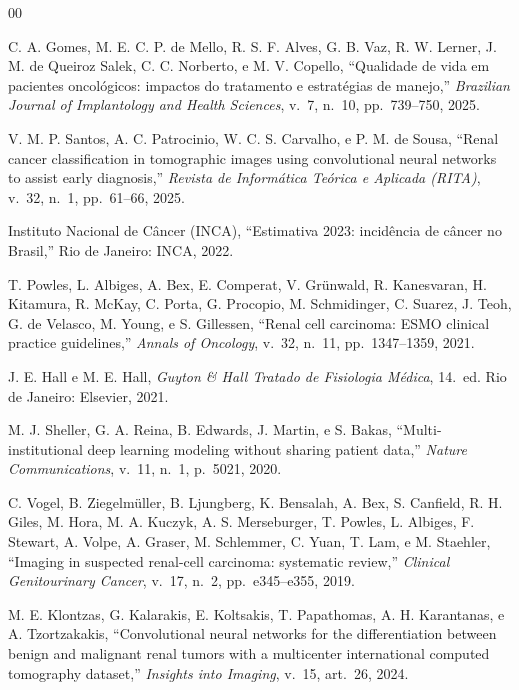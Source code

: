 \documentclass[conference]{IEEEtran}
\begin{document}
\begin{thebibliography}{00}

C. A. Gomes, M. E. C. P. de Mello, R. S. F. Alves, G. B. Vaz,
R. W. Lerner, J. M. de Queiroz Salek, C. C. Norberto, e M. V. Copello,
``Qualidade de vida em pacientes oncológicos: impactos
do tratamento e estratégias de manejo,''
\textit{Brazilian Journal of Implantology and Health Sciences},
v.~7, n.~10, pp.~739--750, 2025.

V. M. P. Santos, A. C. Patrocinio, W. C. S. Carvalho, e P. M. de Sousa,
``Renal cancer classification in tomographic images using convolutional
neural networks to assist early diagnosis,''
\textit{Revista de Informática Teórica e Aplicada (RITA)},
v.~32, n.~1, pp.~61--66, 2025.

Instituto Nacional de Câncer (INCA),
``Estimativa 2023: incidência de câncer no Brasil,''
Rio de Janeiro: INCA, 2022.

T. Powles, L. Albiges, A. Bex, E. Comperat, V. Grünwald, R. Kanesvaran,
H. Kitamura, R. McKay, C. Porta, G. Procopio, M. Schmidinger, C. Suarez,
J. Teoh, G. de Velasco, M. Young, e S. Gillessen,
``Renal cell carcinoma: ESMO clinical practice guidelines,''
\textit{Annals of Oncology}, v.~32, n.~11, pp.~1347--1359, 2021.

J. E. Hall e M. E. Hall,
\textit{Guyton \& Hall Tratado de Fisiologia Médica}, 14.~ed.
Rio de Janeiro: Elsevier, 2021.

M. J. Sheller, G. A. Reina, B. Edwards, J. Martin, e S. Bakas,
``Multi-institutional deep learning modeling without sharing patient data,''
\textit{Nature Communications}, v.~11, n.~1, p.~5021, 2020.

C. Vogel, B. Ziegelmüller, B. Ljungberg, K. Bensalah, A. Bex, S. Canfield,
R. H. Giles, M. Hora, M. A. Kuczyk, A. S. Merseburger, T. Powles, L. Albiges,
F. Stewart, A. Volpe, A. Graser, M. Schlemmer, C. Yuan, T. Lam, e M. Staehler,
``Imaging in suspected renal-cell carcinoma: systematic review,''
\textit{Clinical Genitourinary Cancer}, v.~17, n.~2, pp.~e345--e355, 2019.

M. E. Klontzas, G. Kalarakis, E. Koltsakis, T. Papathomas, A. H. Karantanas,
e A. Tzortzakakis,
``Convolutional neural networks for the differentiation between benign and
malignant renal tumors with a multicenter international computed tomography
dataset,''
\textit{Insights into Imaging}, v.~15, art.~26, 2024.


\end{thebibliography}
\end{document}
